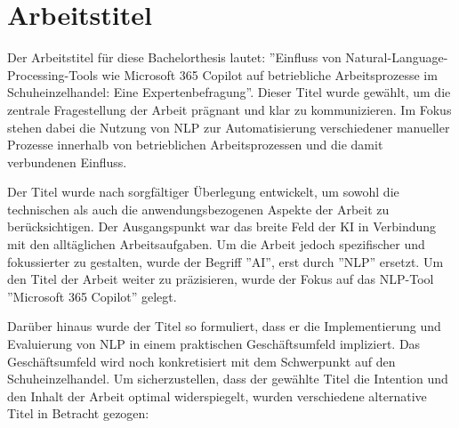 

\section{Arbeitstitel}

Der Arbeitstitel für diese Bachelorthesis lautet: ''Einfluss von Natural-Language-Processing-Tools wie Microsoft 365 Copilot auf betriebliche Arbeitsprozesse im Schuheinzelhandel: Eine Expertenbefragung''. Dieser Titel wurde gewählt, um die zentrale Fragestellung der Arbeit prägnant und klar zu kommunizieren. Im Fokus stehen dabei die Nutzung von NLP zur Automatisierung verschiedener manueller Prozesse innerhalb von betrieblichen Arbeitsprozessen und die damit verbundenen Einfluss.

Der Titel wurde nach sorgfältiger Überlegung entwickelt, um sowohl die technischen als auch die anwendungsbezogenen Aspekte der Arbeit zu berücksichtigen. Der Ausgangspunkt war das breite Feld der KI in Verbindung mit den alltäglichen Arbeitsaufgaben. Um die Arbeit jedoch spezifischer und fokussierter zu gestalten, wurde der Begriff ''AI'', erst durch ''NLP'' ersetzt. Um den Titel der Arbeit weiter zu präzisieren, wurde der Fokus auf das NLP-Tool ''Microsoft 365 Copilot'' gelegt. 

Darüber hinaus wurde der Titel so formuliert, dass er die Implementierung und Evaluierung von NLP in einem praktischen Geschäftsumfeld impliziert. Das Geschäftsumfeld wird noch konkretisiert mit dem Schwerpunkt auf den Schuheinzelhandel.
Um sicherzustellen, dass der gewählte Titel die Intention und den Inhalt der Arbeit optimal widerspiegelt, wurden verschiedene alternative Titel in Betracht gezogen:

